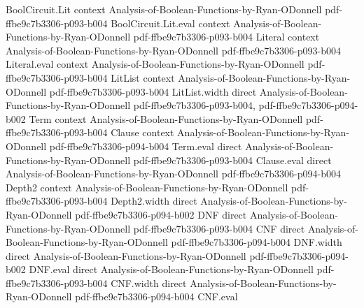 \begin{lemma}
\label{ArrowTheorem.expected_product_abca}
\leanok
{}
\proofstep
  {BoolCircuit.Lit}
  {context}
  {Analysis-of-Boolean-Functions-by-Ryan-ODonnell}
  {pdf-ffbe9c7b3306-p093-b004}
\proofstep
  {BoolCircuit.Lit.eval}
  {context}
  {Analysis-of-Boolean-Functions-by-Ryan-ODonnell}
  {pdf-ffbe9c7b3306-p093-b004}
\proofstep
  {Literal}
  {context}
  {Analysis-of-Boolean-Functions-by-Ryan-ODonnell}
  {pdf-ffbe9c7b3306-p093-b004}
\proofstep
  {Literal.eval}
  {context}
  {Analysis-of-Boolean-Functions-by-Ryan-ODonnell}
  {pdf-ffbe9c7b3306-p093-b004}
\proofstep
  {LitList}
  {context}
  {Analysis-of-Boolean-Functions-by-Ryan-ODonnell}
  {pdf-ffbe9c7b3306-p093-b004}
\proofstep
  {LitList.width}
  {direct}
  {Analysis-of-Boolean-Functions-by-Ryan-ODonnell}
  {pdf-ffbe9c7b3306-p093-b004,
    pdf-ffbe9c7b3306-p094-b002}
\proofstep
  {Term}
  {context}
  {Analysis-of-Boolean-Functions-by-Ryan-ODonnell}
  {pdf-ffbe9c7b3306-p093-b004}
\proofstep
  {Clause}
  {context}
  {Analysis-of-Boolean-Functions-by-Ryan-ODonnell}
  {pdf-ffbe9c7b3306-p094-b004}
\proofstep
  {Term.eval}
  {direct}
  {Analysis-of-Boolean-Functions-by-Ryan-ODonnell}
  {pdf-ffbe9c7b3306-p093-b004}
\proofstep
  {Clause.eval}
  {direct}
  {Analysis-of-Boolean-Functions-by-Ryan-ODonnell}
  {pdf-ffbe9c7b3306-p094-b004}
\proofstep
  {Depth2}
  {context}
  {Analysis-of-Boolean-Functions-by-Ryan-ODonnell}
  {pdf-ffbe9c7b3306-p093-b004}
\proofstep
  {Depth2.width}
  {direct}
  {Analysis-of-Boolean-Functions-by-Ryan-ODonnell}
  {pdf-ffbe9c7b3306-p094-b002}
\proofstep
  {DNF}
  {direct}
  {Analysis-of-Boolean-Functions-by-Ryan-ODonnell}
  {pdf-ffbe9c7b3306-p093-b004}
\proofstep
  {CNF}
  {direct}
  {Analysis-of-Boolean-Functions-by-Ryan-ODonnell}
  {pdf-ffbe9c7b3306-p094-b004}
\proofstep
  {DNF.width}
  {direct}
  {Analysis-of-Boolean-Functions-by-Ryan-ODonnell}
  {pdf-ffbe9c7b3306-p094-b002}
\proofstep
  {DNF.eval}
  {direct}
  {Analysis-of-Boolean-Functions-by-Ryan-ODonnell}
  {pdf-ffbe9c7b3306-p093-b004}
\proofstep
  {CNF.width}
  {direct}
  {Analysis-of-Boolean-Functions-by-Ryan-ODonnell}
  {pdf-ffbe9c7b3306-p094-b004}
\proofstep
  {CNF.eval}

\end{lemma}
